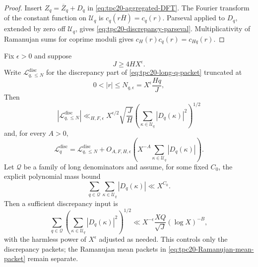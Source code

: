 \begin{proof}
Insert \(Z_q=\overline Z_q+D_q\) in
\eqref{eq:tpc20-aggregated-DFT}.  The Fourier transform of the constant
function on \(\mathcal U_q\) is \(c_q(r\overline H)=c_q(r)\).  Parseval
applied to \(D_q\), extended by zero off \(\mathcal U_q\), gives
\eqref{eq:tpc20-discrepancy-parseval}.  Multiplicativity of Ramanujan
sums for coprime moduli gives \(c_H(r)c_q(r)=c_{Hq}(r)\).
\end{proof}

\begin{proposition}
\label{prop:tpc20-restricted-fiber-bound}
Fix \(\epsilon>0\) and suppose
\begin{equation}
 J\ge 4HX^\epsilon.
 \label{eq:tpc20-no-frequency-wrap}
\end{equation}
Write \(\mathcal L_{q,\le N}^{\mathrm{disc}}\) for the discrepancy
part of \eqref{eq:tpc20-long-q-packet} truncated at
\begin{equation}
 0<|r|\le N_{q,\epsilon}=X^\epsilon\frac{Hq}{J},
 \label{eq:tpc20-fiber-window}
\end{equation}
Then
\begin{equation}
 \boxed{
 |\mathcal L_{q,\le N}^{\mathrm{disc}}|
 \ll_{H,F,\epsilon}
 X^{\epsilon/2}\sqrt{\frac JH}
 \left(\sum_{\kappa\in\mathcal U_q}|D_q(\kappa)|^2\right)^{1/2}}
 \label{eq:tpc20-restricted-fiber-bound}
\end{equation}
and, for every \(A>0\),
\begin{equation}
 \mathcal L_q^{\mathrm{disc}}
 =\mathcal L_{q,\le N}^{\mathrm{disc}}
 +O_{A,F,H,\epsilon}\!\left(
 X^{-A}\sum_{\kappa\in\mathcal U_q}|D_q(\kappa)|\right).
 \label{eq:tpc20-fiber-tail-error}
\end{equation}
Let \(\mathcal Q\) be a family of long denominators and assume, for some
fixed \(C_0\), the explicit polynomial mass bound
\begin{equation}
 \sum_{q\in\mathcal Q}\sum_{\kappa\in\mathcal U_q}
 |D_q(\kappa)|\ll X^{C_0}.
 \label{eq:tpc20-fiber-tail-mass}
\end{equation}
Then a sufficient discrepancy input is
\begin{equation}
 \sum_{q\in\mathcal Q}
 \left(\sum_{\kappa\in\mathcal U_q}|D_q(\kappa)|^2\right)^{1/2}
 \ll X^{-\epsilon}\frac{XQ}{\sqrt J}(\log X)^{-B},
 \label{eq:tpc20-fiber-gate}
\end{equation}
with the harmless power of \(X^\epsilon\) adjusted as needed.  This
controls only the discrepancy packets; the Ramanujan mean packets in
\eqref{eq:tpc20-Ramanujan-mean-packet} remain separate.
\end{proposition}


